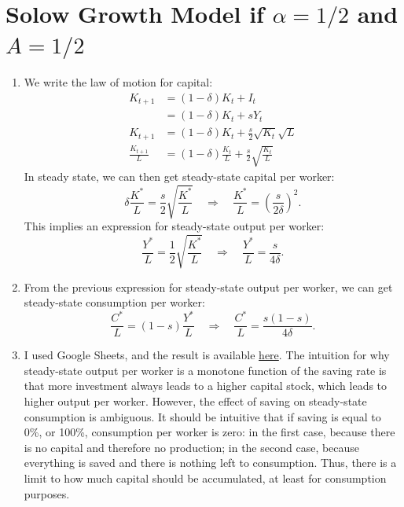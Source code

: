 \documentclass[]{book}
\begin{document}
\section{\texorpdfstring{Solow Growth Model if \(\alpha = 1/2\) and
\(A=1/2\)}{Solow Growth Model if \textbackslash{}alpha = 1/2 and A=1/2}}\label{solow-growth-model-if-alpha-12-and-a12-1}

\begin{enumerate}
\def\labelenumi{\arabic{enumi}.}
\item
  We write the law of motion for capital: \[
  \begin{aligned}
  K_{t+1}&=(1-\delta)K_{t}+I_{t}\\
  &=(1-\delta)K_{t}+sY_{t}\\
  K_{t+1} &=(1-\delta)K_{t}+\frac{s}{2}\sqrt{K_{t}}\sqrt{L}\\
  \frac{K_{t+1}}{L}&=(1-\delta)\frac{K_{t}}{L}+\frac{s}{2}\sqrt{\frac{K_{t}}{L}}
  \end{aligned}
  \] In steady state, we can then get steady-state capital per worker:
  \[\delta\frac{K^{*}}{L}=\frac{s}{2}\sqrt{\frac{K^{*}}{L}}\quad\Rightarrow\quad\boxed{\frac{K^{*}}{L}=\left(\frac{s}{2\delta}\right)^{2}}.\]
  This implies an expression for steady-state output per worker:
  \[\frac{Y^{*}}{L}=\frac{1}{2}\sqrt{\frac{K^{*}}{L}} \quad \Rightarrow \quad \boxed{\frac{Y^{*}}{L}=\frac{s}{4\delta}}.\]
\item
  From the previous expression for steady-state output per worker, we
  can get steady-state consumption per worker:
  \[\frac{C^{*}}{L}=(1-s)\frac{Y^{*}}{L}\quad\Rightarrow\quad\boxed{\frac{C^{*}}{L}=\frac{s(1-s)}{4\delta}}.\]
\item
  I used Google Sheets, and the result is available
  \href{https://docs.google.com/spreadsheets/d/1dkygwhDNT79cU_mTVXWal4RyGwX38OTnu5iS5UTz1fc/edit?usp=sharing}{here}.
  The intuition for why steady-state output per worker is a monotone
  function of the saving rate is that more investment always leads to a
  higher capital stock, which leads to higher output per worker.
  However, the effect of saving on steady-state consumption is
  ambiguous. It should be intuitive that if saving is equal to 0\%, or
  100\%, consumption per worker is zero: in the first case, because
  there is no capital and therefore no production; in the second case,
  because everything is saved and there is nothing left to consumption.
  Thus, there is a limit to how much capital should be accumulated, at
  least for consumption purposes.
\end{enumerate}
\end{document}
